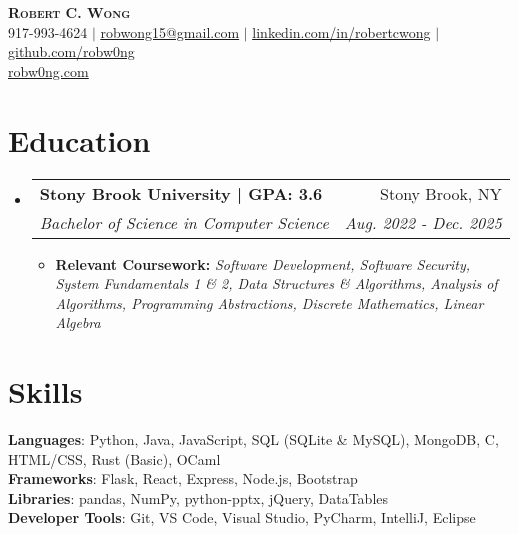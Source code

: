 \documentclass[letterpaper,11pt]{article}
\makeatletter
\newcommand{\resumeSubheading}[4]{
    \vspace{-2pt}\item
      \begin{tabular*}{0.97\textwidth}[t]{l@{\extracolsep{\fill}}r}
        \textbf{#1} & #2 \\
        \textit{\small#3} & \textit{\small #4} \\
      \end{tabular*}\vspace{-7pt}
  }
\newcommand{\resumeSubHeadingListStart}{\begin{itemize}[leftmargin=0.15in, label={}]}
\newcommand{\resumeSubHeadingListEnd}{\end{itemize}}
\makeatother
\begin{document}
\begin{center}
  \textbf{\Huge \scshape Robert C. Wong} \\ \vspace{1pt}
  \small 917-993-4624 $|$ \href{mailto:robwon15@gmail.com}{\underline{robwong15@gmail.com}} $|$
  \href{https://linkedin.com/in/robertcwong}{\underline{linkedin.com/in/robertcwong}} $|$
  \href{https://github.com/robw0ng/}{\underline{github.com/robw0ng}}
  \\
  \href{https://robw0ng.com/}{\underline{robw0ng.com}}

\end{center}

\section{Education}
\resumeSubHeadingListStart
\resumeSubheading
{Stony Brook University | GPA: 3.6}{Stony Brook, NY}
{Bachelor of Science in Computer Science}{Aug. 2022 - Dec. 2025}
\begin{itemize}[leftmargin=0.15in, label={}, itemsep=10pt, topsep=5pt, parsep=0pt, partopsep=0pt]
  \item \small{\textbf{Relevant Coursework:} \textit{Software Development, Software Security, System Fundamentals 1 \& 2, Data Structures \& Algorithms, Analysis of Algorithms, Programming Abstractions, Discrete Mathematics, Linear Algebra}}
\end{itemize}
\resumeSubHeadingListEnd
\vspace{-12pt}

\section{Skills}
\begin{itemize}[leftmargin=0.15in, label={}]
  \small{\item{
        \textbf{Languages}{: Python, Java, JavaScript, SQL (SQLite \& MySQL), MongoDB, C, HTML/CSS, Rust (Basic), OCaml} \\
        \textbf{Frameworks}{: Flask, React, Express, Node.js, Bootstrap} \\
        \textbf{Libraries}{: pandas, NumPy, python-pptx, jQuery, DataTables} \\
        \textbf{Developer Tools}{: Git, VS Code, Visual Studio, PyCharm, IntelliJ, Eclipse} \\
        }}
\end{itemize}
\vspace{-12pt}
\end{document}
